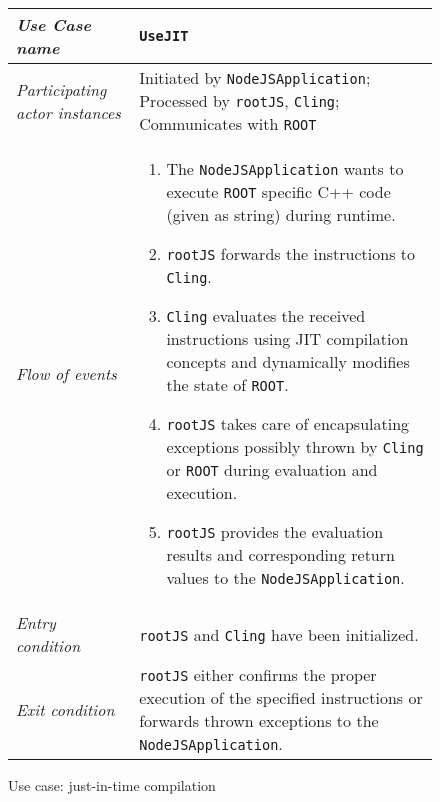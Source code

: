 \begin{figure}[htb]
	\centering
	\begin{longtable}{p{3cm} @{\hskip 1cm} p{12cm}}
		\hline

		\textit{Use Case name} & \texttt{UseJIT}\\
		\hline

		\textit{Participating actor instances} & Initiated by \texttt{NodeJSApplication}; Processed by \texttt{rootJS}, \texttt{Cling}; Communicates with \texttt{ROOT}\\
		\hline

		\textit{Flow of events} &
		\begin{enumerate}
			\item The \texttt{NodeJSApplication} wants to execute \texttt{ROOT} specific C++ code (given as string) during runtime.

			\item \texttt{rootJS} forwards the instructions to \texttt{Cling}.

			\item \texttt{Cling} evaluates the received instructions using JIT compilation concepts and dynamically modifies the state of \texttt{ROOT}.

			\item \texttt{rootJS} takes care of encapsulating exceptions possibly thrown by \texttt{Cling} or \texttt{ROOT} during evaluation and execution.

			\item \texttt{rootJS} provides the evaluation results and corresponding return values to the \texttt{NodeJSApplication}.
		\end{enumerate}
		\\
		\hline

		\textit{Entry condition} & \texttt{rootJS} and \texttt{Cling} have been initialized.\\
		\hline

		\textit{Exit condition} & \texttt{rootJS} either confirms the proper execution of the specified instructions or forwards thrown exceptions to the \texttt{NodeJSApplication}.\\
		\hline
	\end{longtable}

	\caption{Use case: just-in-time compilation}
\end{figure}
